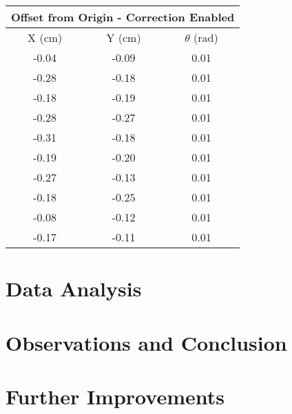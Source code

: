 \documentclass[11pt]{article} %
\begin{document}
\begin{center}
\begin{tabular}{ | c | c | c | }
\multicolumn{3}{c}{Offset from Origin - Correction Enabled} \\ \hline
X (cm) & Y (cm) & $\theta$ (rad)\\ \hline
-0.04 & -0.09 & 0.01 \\ \hline
-0.28 & -0.18 & 0.01 \\ \hline
-0.18 & -0.19 & 0.01 \\ \hline
-0.28 & -0.27 & 0.01 \\ \hline
-0.31 & -0.18 & 0.01 \\ \hline
-0.19 & -0.20 & 0.01 \\ \hline
-0.27 & -0.13 & 0.01 \\ \hline
-0.18 & -0.25 & 0.01 \\ \hline
-0.08 & -0.12 & 0.01 \\ \hline
-0.17 & -0.11 & 0.01 \\ \hline
\end{tabular}
\end{center}

\section{Data Analysis}

\section{Observations and Conclusion}

\section{Further Improvements}
\end{document}
